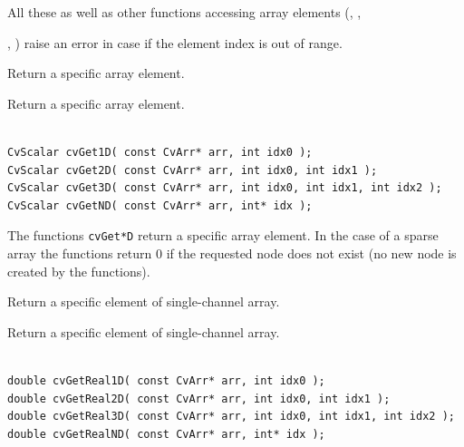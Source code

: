 All these as well as other functions accessing array elements (, , 

, ) raise an error in case if the element index is out of range.


\ifplastex
{} 
 
 
Return a specific array element.

\else
{}\label{Get*D}

Return a specific array element.

\begin{lstlisting}

CvScalar cvGet1D( const CvArr* arr, int idx0 );
CvScalar cvGet2D( const CvArr* arr, int idx0, int idx1 );
CvScalar cvGet3D( const CvArr* arr, int idx0, int idx1, int idx2 );
CvScalar cvGetND( const CvArr* arr, int* idx );

\end{lstlisting}
\fi

\begin{description}
\end{description}


The functions \texttt{cvGet*D} return a specific array element. In the case of a sparse array the functions return 0 if the requested node does not exist (no new node is created by the functions).

\ifplastex
{} 
 
 
Return a specific element of single-channel array.

\else
{}\label{GetReal*D}

Return a specific element of single-channel array.

\begin{lstlisting}

double cvGetReal1D( const CvArr* arr, int idx0 );
double cvGetReal2D( const CvArr* arr, int idx0, int idx1 );
double cvGetReal3D( const CvArr* arr, int idx0, int idx1, int idx2 );
double cvGetRealND( const CvArr* arr, int* idx );

\end{lstlisting}
\fi


